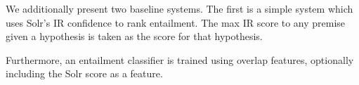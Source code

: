 We additionally present two baseline systems.
The first is a simple system which uses Solr's IR confidence to rank
  entailment.
The max IR score to any premise given a hypothesis is taken
  as the score for that hypothesis.

Furthermore, an entailment classifier is trained
  using overlap features, optionally including
  the Solr score as a feature.

%
%

%
%
\def\t#1{\small{#1}}
\def\b#1{\t{\textbf{#1}}}
\def\colspaceS{2.0mm}
\def\colspaceM{3.0mm}
\def\colspaceL{4.0mm}


